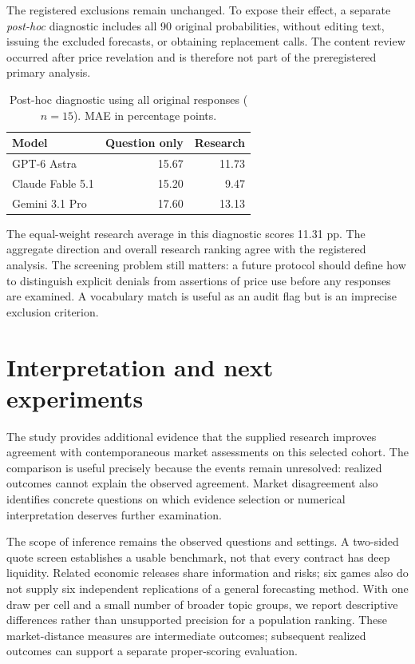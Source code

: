 \documentclass[11pt]{article}
\begin{document}
The registered exclusions remain unchanged. To expose their effect, a separate
\emph{post-hoc} diagnostic includes all 90 original probabilities, without
editing text, issuing the excluded forecasts, or obtaining replacement calls.
The content review occurred after price revelation and is therefore not part
of the preregistered primary analysis.

\begin{table}[htbp]
\centering
\caption{Post-hoc diagnostic using all original responses ($n=15$). MAE in percentage points.}
\begin{tabular}{lrr}
\toprule
Model & Question only & Research\\
\midrule
GPT-6 Astra & 15.67 & 11.73\\
Claude Fable 5.1 & 15.20 & 9.47\\
Gemini 3.1 Pro & 17.60 & 13.13\\
\bottomrule
\end{tabular}
\end{table}

The equal-weight research average in this diagnostic scores 11.31 pp. The
aggregate direction and overall research ranking agree with the registered
analysis. The screening problem still matters: a future protocol should define
how to distinguish explicit denials from assertions of price use before any
responses are examined. A vocabulary match is useful as an audit flag but is an
imprecise exclusion criterion.

\section{Interpretation and next experiments}
The study provides additional evidence that the supplied research improves
agreement with contemporaneous market assessments on this selected cohort.
The comparison is useful precisely because the events remain unresolved:
realized outcomes cannot explain the observed agreement. Market disagreement
also identifies concrete questions on which evidence selection or numerical
interpretation deserves further examination.

The scope of inference remains the observed questions and settings. A two-sided
quote screen establishes a usable benchmark, not that every contract has deep
liquidity. Related economic releases share information and risks; six games
also do not supply six independent replications of a general forecasting
method. With one draw per cell and a small number of broader topic groups,
we report descriptive differences rather than unsupported precision for a
population ranking. These market-distance measures are intermediate outcomes;
subsequent realized outcomes can support a separate proper-scoring evaluation.
\end{document}
